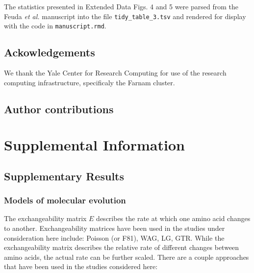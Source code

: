 \documentclass[]{article}
\begin{document}
The statistics presented in Extended Data Figs. 4 and 5 were parsed from
the Feuda \emph{et al.} manuscript into the file
\texttt{tidy\_table\_3.tsv} and rendered for display with the code in
\texttt{manuscript.rmd}.

\hypertarget{ackowledgements}{%
\subsection{Ackowledgements}\label{ackowledgements}}

We thank the Yale Center for Research Computing for use of the research
computing infrastructure, specificaly the Farnam cluster.

\hypertarget{author-contributions}{%
\subsection{Author contributions}\label{author-contributions}}

\pagebreak

\hypertarget{supplemental-information}{%
\section{Supplemental Information}\label{supplemental-information}}

\hypertarget{supplementary-results}{%
\subsection{Supplementary Results}\label{supplementary-results}}

\hypertarget{models-of-molecular-evolution-1}{%
\subsubsection{Models of molecular
evolution}\label{models-of-molecular-evolution-1}}

The exchangeability matrix \(E\) describes the rate at which one amino
acid changes to another. Exchangeability matrices have been used in the
studies under consideration here include: Poisson (or F81), WAG, LG,
GTR. While the exchangeability matrix describes the relative rate of
different changes between amino acids, the actual rate can be further
scaled. There are a couple approaches that have been used in the studies
considered here:
\end{document}
